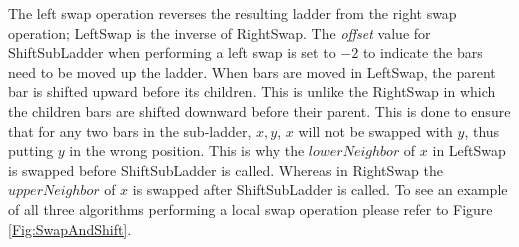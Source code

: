 The left swap operation reverses the resulting ladder from the right swap operation; {\sc LeftSwap}
is the inverse of {\sc RightSwap}. The \textit{offset} value for {\sc ShiftSubLadder} when 
performing a left swap is set to $-2$ to indicate the bars need to be moved up the ladder. 
When bars are moved in {\sc LeftSwap}, the parent bar is shifted upward before its children.
This is unlike the {\sc RightSwap} in which the children bars are shifted downward 
before their parent. This is done to ensure that for any two bars in the sub-ladder, 
$x,y$, $x$ will not be swapped with $y$, thus putting $y$ in the wrong position. 
This is why the $lowerNeighbor$ of $x$ in {\sc LeftSwap} is swapped before 
{\sc ShiftSubLadder} is called. Whereas in {\sc RightSwap} the $upperNeighbor$ 
of $x$ is swapped after {\sc ShiftSubLadder} is called.
To see an example of all three algorithms performing a local swap operation please refer to Figure \ref{Fig:SwapAndShift}.\pagebreak
